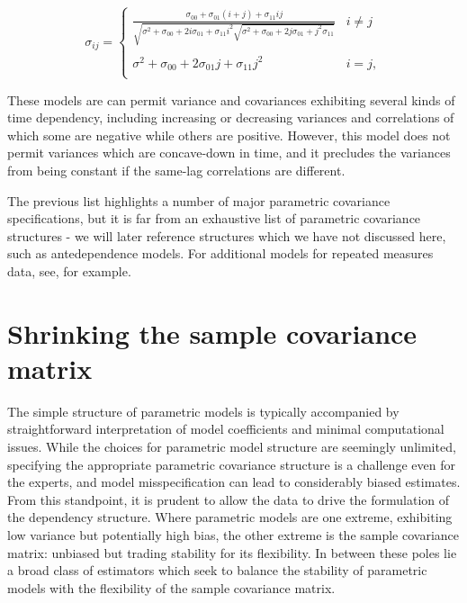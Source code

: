 \begin{equation}
\sigma_{ij} = \left\{ \begin{array}{ll}
\frac{\sigma_{00} + \sigma_{01}\left(i + j\right) + \sigma_{11} ij}{\sqrt{\sigma^2 + \sigma_{00} + 2i\sigma_{01} + \sigma_{11}i^2\sqrt{\sigma^2 + \sigma_{00} + 2j\sigma_{01} +j^2\sigma_{11}} }} &  i \ne j \\ 
& \\
\sigma^2 + \sigma_{00} + 2\sigma_{01}j + \sigma_{11}j^2 &  i= j, \\
\end{array}\right.
\end{equation}
\newline

These models are can permit variance and covariances exhibiting several kinds of time dependency, including increasing or decreasing variances and correlations of which some are negative while others are positive. However, this model does not permit variances which are concave-down in time, and it precludes the variances from being constant if the same-lag correlations are different.

\bigskip

The previous list highlights a number of major parametric covariance specifications, but it is far from an exhaustive list of parametric covariance structures - we will later reference structures which we have not discussed here, such as antedependence models. For additional models for repeated measures data, see\cite{jennrich1986unbalanced}, for example. 



\section{Shrinking the sample covariance matrix} \label{chapter-1-shrinking-the-sample-cov}

The simple structure of parametric models is typically accompanied by straightforward interpretation of model coefficients and minimal computational issues. While the choices for parametric model structure are seemingly unlimited, specifying the appropriate parametric covariance structure is a challenge even for the experts, and model misspecification can lead to considerably biased estimates. From this standpoint, it is prudent to allow the data to drive the formulation of the dependency structure. Where parametric models are one extreme, exhibiting low variance but potentially high bias, the other extreme is the sample covariance matrix: unbiased but trading stability for its flexibility. In between these poles lie a broad class of estimators which seek to balance the stability of parametric models with the flexibility of the sample covariance matrix.

